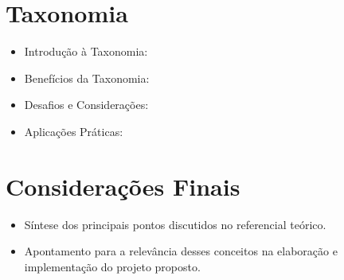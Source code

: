 \section{Taxonomia}
\label{cap2:taxonomia}
\begin{itemize}
	\item Introdução à Taxonomia:

	\item Benefícios da Taxonomia: 

	
	\item Desafios e Considerações:

	
	\item Aplicações Práticas: 

\end{itemize}

\section{Considerações Finais}
 \label{cap2:consideracoesFinais}
\begin{itemize}
	\item Síntese dos principais pontos discutidos no referencial teórico.
	\item Apontamento para a relevância desses conceitos na elaboração e implementação do projeto proposto.
\end{itemize}
	

\blindtext[2]
